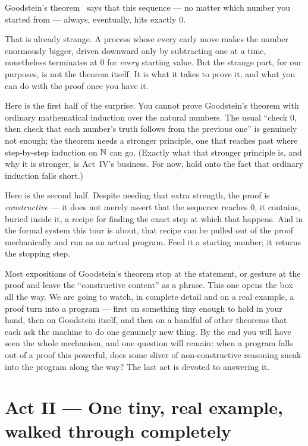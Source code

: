 \documentclass[11pt]{article}
\begin{document}
Goodstein's theorem~\citep{goodstein1944} says that this sequence --- no matter
which number you started from --- always, eventually, hits exactly $0$.

That is already strange. A process whose every early move makes the number
enormously bigger, driven downward only by subtracting one at a time,
nonetheless terminates at $0$ for \emph{every} starting value. But the
strange part, for our purposes, is not the theorem itself. It is what it
takes to prove it, and what you can do with the proof once you have it.

Here is the first half of the surprise. You cannot prove Goodstein's theorem
with ordinary mathematical induction over the natural numbers. The usual
``check $0$, then check that each number's truth follows from the previous
one'' is genuinely not enough; the theorem needs a stronger principle, one
that reaches past where step-by-step induction on $\mathbb{N}$ can go. (Exactly
what that stronger principle is, and why it is stronger, is Act~IV's
business. For now, hold onto the fact that ordinary induction falls short.)

Here is the second half. Despite needing that extra strength, the proof is
\emph{constructive} --- it does not merely assert that the sequence reaches
$0$, it contains, buried inside it, a recipe for finding the exact step at
which that happens. And in the formal system this tour is about, that recipe
can be pulled out of the proof mechanically and run as an actual program.
Feed it a starting number; it returns the stopping step.

Most expositions of Goodstein's theorem stop at the statement, or gesture at
the proof and leave the ``constructive content'' as a phrase. This one opens
the box all the way. We are going to watch, in complete detail and on a real
example, a proof turn into a program --- first on something tiny enough to
hold in your hand, then on Goodstein itself, and then on a handful of other
theorems that each ask the machine to do one genuinely new thing. By the end
you will have seen the whole mechanism, and one question will remain: when a
program falls out of a proof this powerful, does some sliver of
non-constructive reasoning sneak into the program along the way? The last act
is devoted to answering it.

\section{Act II --- One tiny, real example, walked through completely}
\end{document}
